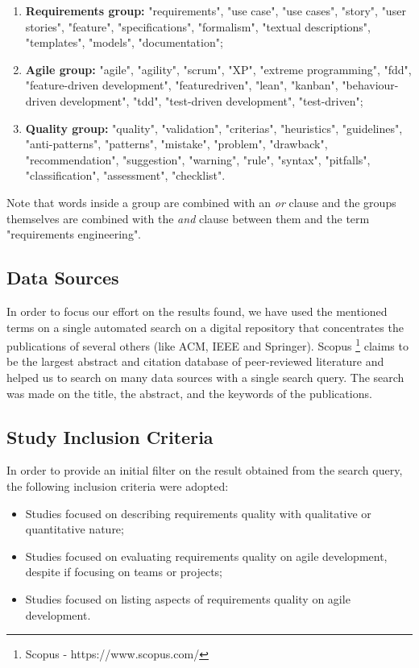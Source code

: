\begin{enumerate}
\item \textbf{Requirements group:} "requirements", "use case", "use cases", "story", "user stories", "feature", "specifications", "formalism", "textual descriptions", "templates", "models", "documentation";
\item \textbf{Agile group:} "agile", "agility", "scrum", "XP", "extreme programming", "fdd", "feature-driven development", "featuredriven", "lean", "kanban", "behaviour-driven development", "tdd", "test-driven development", "test-driven";
\item \textbf{Quality group:} "quality", "validation", "criterias", "heuristics", "guidelines", "anti-patterns", "patterns", "mistake", "problem", "drawback", "recommendation", "suggestion", "warning", "rule", "syntax", "pitfalls", "classification", "assessment", "checklist".
\end{enumerate}

Note that words inside a group are combined with an \textit{or} clause and the groups themselves are combined with the \textit{and} clause between them and the term "requirements engineering". 

\subsection{Data Sources}

In order to focus our effort on the results found, we have used the mentioned terms on a single automated search on a digital repository that concentrates the publications of several others (like ACM, IEEE and Springer). Scopus \footnote{Scopus - https://www.scopus.com/} claims to be the largest abstract and citation database of peer-reviewed literature and helped us to search on many data sources with a single search query. The search was made on the title, the abstract, and the keywords of the publications.

\subsection{Study Inclusion Criteria}

In order to provide an initial filter on the result obtained from the search query, the following inclusion criteria were adopted:

\begin{itemize}[noitemsep,nolistsep]
    \item Studies focused on describing requirements quality with qualitative or quantitative nature;
    \item Studies focused on evaluating requirements quality on agile development, despite if focusing on teams or projects;
    \item Studies focused on listing aspects of requirements quality on agile development.
\end{itemize}

